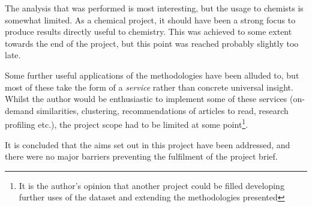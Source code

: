 The analysis that was performed is most interesting, but the usage to chemists is somewhat limited. As a chemical project, it should have been a strong focus to produce results directly useful to chemistry. This was achieved to some extent towards the end of the project, but this point was reached probably slightly too late.

Some further useful applications of the methodologies have been alluded to, but most of these take the form of a \emph{service} rather than concrete universal insight. Whilst the author would be enthusiastic to implement some of these services (on-demand similarities, clustering, recommendations of articles to read, research profiling etc.), the project scope had to be limited at some point\footnote{It is the author's opinion that another project could be filled developing further uses of the dataset and extending the methodologies presented}.

It is concluded that the aims set out in this project have been addressed, and there were no major barriers preventing the fulfilment of the project brief. 